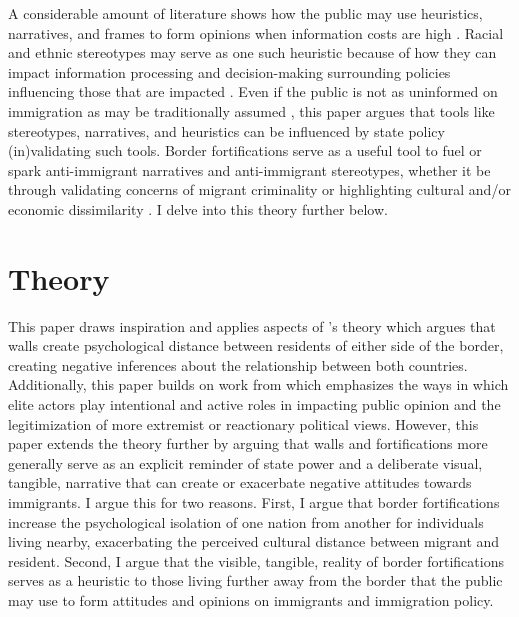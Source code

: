 \documentclass[12pt,]{article}
\begin{document}
A considerable amount of literature shows how the public may use
heuristics, narratives, and frames to form opinions when information
costs are high
\citep{mondak1993, rugeley2012, petersen2009, aaroe2014, culpepper2024}.
Racial and ethnic stereotypes may serve as one such heuristic because of
how they can impact information processing and decision-making
surrounding policies influencing those that are impacted
\citep{burns2000}. Even if the public is not as uninformed on
immigration as may be traditionally assumed \citep{lahav2004}, this
paper argues that tools like stereotypes, narratives, and heuristics can
be influenced by state policy (in)validating such tools. Border
fortifications serve as a useful tool to fuel or spark anti-immigrant
narratives and anti-immigrant stereotypes, whether it be through
validating concerns of migrant criminality or highlighting cultural
and/or economic dissimilarity
\citep{jaramillo-dent2021, mutz2022, carter2017}. I delve into this
theory further below.

\section{Theory}\label{theory}

This paper draws inspiration and applies aspects of \citet{mutz2022}'s
theory which argues that walls create psychological distance between
residents of either side of the border, creating negative inferences
about the relationship between both countries. Additionally, this paper
builds on work from \citet{mondon2022} which emphasizes the ways in
which elite actors play intentional and active roles in impacting public
opinion and the legitimization of more extremist or reactionary
political views. However, this paper extends the theory further by
arguing that walls and fortifications more generally serve as an
explicit reminder of state power and a deliberate visual, tangible,
narrative that can create or exacerbate negative attitudes towards
immigrants. I argue this for two reasons. First, I argue that border
fortifications increase the psychological isolation of one nation from
another for individuals living nearby, exacerbating the perceived
cultural distance between migrant and resident. Second, I argue that the
visible, tangible, reality of border fortifications serves as a
heuristic to those living further away from the border that the public
may use to form attitudes and opinions on immigrants and immigration
policy.
\end{document}
